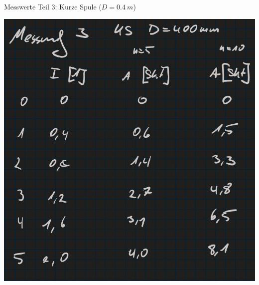%
\begin{table}[ht]
    \centering
    \caption[Messung kurze Spule \(D=\SI{0,4}{m}\)]{Messwerte Teil 3: Kurze Spule (\(D=\SI{0,4}{m}\))}
    \includegraphics[height=.5\textheight]{messungen/messung3.jpg}
    \label{tab:mess3}
\end{table}